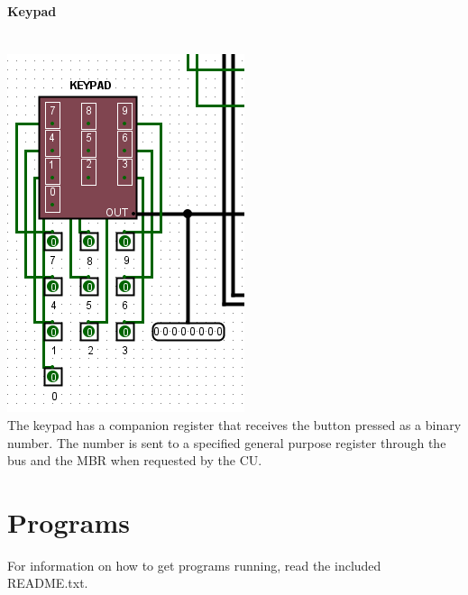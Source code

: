 \documentclass{article}
\begin{document}
	\paragraph{Keypad}~
	\\ \includegraphics[scale=0.5]{KP}\\The keypad has a companion register that receives the button pressed as a binary number. The number is sent to a specified general purpose register through the bus and the MBR when requested by the CU.
	\section{Programs}
	For information on how to get programs running, read the included README.txt.
\end{document}
